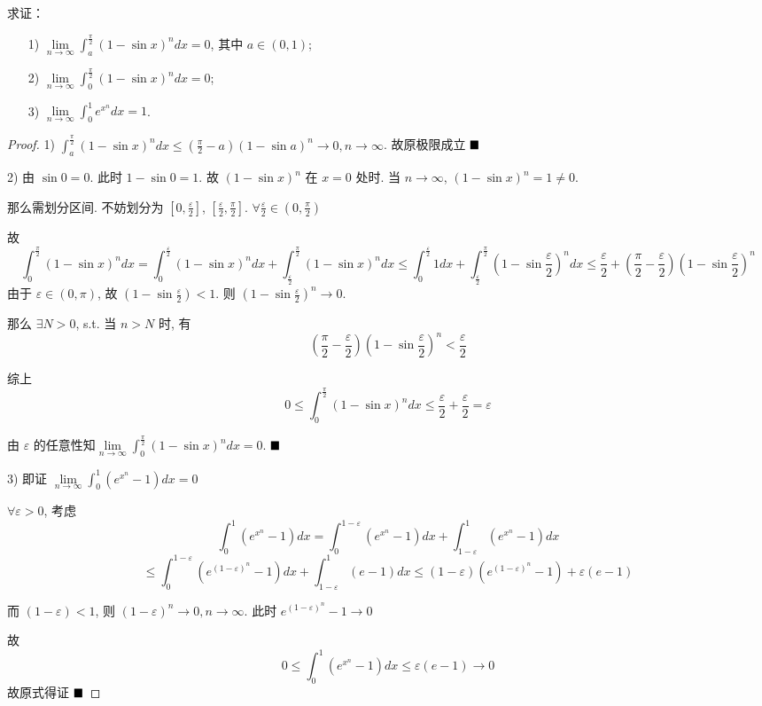 \documentclass[lang=cn,newtx,10pt,scheme=chinese]{elegantbook}
\begin{document}
\begin{exercise}
求证：
\begin{enumerate}
    \item[1)] $\lim\limits_{n \to \infty} \int_{a}^{\frac{\pi}{2}} (1-\sin x)^n dx = 0$, 其中 $a \in (0,1)$;
    \item[2)] $\lim\limits_{n \to \infty} \int_{0}^{\frac{\pi}{2}} (1-\sin x)^n dx = 0$; 
    \item[3)] $\lim\limits_{n \to \infty} \int_{0}^{1} e^{x^n} dx = 1$. 
\end{enumerate}
\end{exercise}
\begin{proof}
    1) $\int_{a}^{\frac{\pi}{2}} (1-\sin x)^n dx \le (\frac{\pi}{2}-a)(1-\sin a)^n \to 0, n \to \infty$.
故原极限成立 $\hfill \blacksquare$

    2) 由 $\sin 0 = 0$. 此时 $1 - \sin 0=1$. 故 $(1-\sin x)^n$ 在 $x=0$ 处时. 当 $n \to \infty$, $(1-\sin x)^n = 1 \neq 0$.

    那么需划分区间. 不妨划分为 $[0, \frac{\varepsilon}{2}]$, $[\frac{\varepsilon}{2}, \frac{\pi}{2}]$. $\forall \frac{\varepsilon}{2} \in (0, \frac{\pi}{2})$

    故 
    $$
    \int_{0}^{\frac{\pi}{2}} (1-\sin x)^n dx = \int_{0}^{\frac{\varepsilon}{2}} (1-\sin x)^n dx + \int_{\frac{\varepsilon}{2}}^{\frac{\pi}{2}} (1-\sin x)^n dx\le \int_{0}^{\frac{\varepsilon}{2}} 1 dx + \int_{\frac{\varepsilon}{2}}^{\frac{\pi}{2}} (1-\sin \frac{\varepsilon}{2})^n dx\le \frac{\varepsilon}{2} + (\frac{\pi}{2} - \frac{\varepsilon}{2}) (1-\sin \frac{\varepsilon}{2})^n
    $$
    由于 $\varepsilon \in (0, \pi)$, 故 $(1-\sin \frac{\varepsilon}{2}) < 1$. 则 $(1-\sin \frac{\varepsilon}{2})^n \to 0$.

    那么 $\exists N > 0$, s.t. 当 $n > N$ 时, 有 
    $$
    (\frac{\pi}{2} - \frac{\varepsilon}{2}) (1-\sin \frac{\varepsilon}{2})^n < \frac{\varepsilon}{2}
    $$


    综上
    $$
    0 \le \int_{0}^{\frac{\pi}{2}} (1-\sin x)^n dx \le \frac{\varepsilon}{2} + \frac{\varepsilon}{2} = \varepsilon
    $$
    

    由 $\varepsilon$ 的任意性知$\lim\limits_{n \to \infty} \int_{0}^{\frac{\pi}{2}} (1-\sin x)^n dx = 0$.  $\hfill \blacksquare$

    3)
    即证 $\lim\limits_{n \to \infty} \int_{0}^{1} (e^{x^n}-1) dx = 0$

    $\forall \varepsilon > 0$, 考虑 $$\int_{0}^{1} (e^{x^n}-1) dx = \int_{0}^{1-\varepsilon} (e^{x^n}-1) dx + \int_{1-\varepsilon}^{1} (e^{x^n}-1) dx$$
    $$\le \int_{0}^{1-\varepsilon} (e^{(1-\varepsilon)^n}-1) dx + \int_{1-\varepsilon}^{1} (e-1) dx \le (1-\varepsilon)(e^{(1-\varepsilon)^n}-1) + \varepsilon(e-1)$$

    而 $(1-\varepsilon)<1$, 则 $(1-\varepsilon)^n \to 0, n \to \infty$.
    此时 $e^{(1-\varepsilon)^n}-1 \to 0$

    故 $$0 \le \int_{0}^{1} (e^{x^n}-1) dx \le \varepsilon(e-1) \to 0$$
    故原式得证  $\hfill \blacksquare$
\end{proof}
\end{document}
